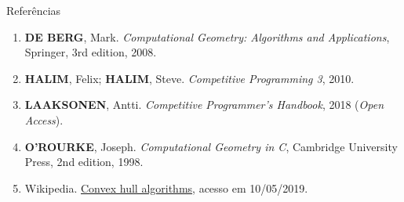 \begin{frame}[fragile]{Referências}

    \begin{enumerate}

        \item \textbf{DE BERG}, Mark. \textit{Computational Geometry: Algorithms and Applications}, Springer, 3rd edition, 2008.

        \item \textbf{HALIM}, Felix; \textbf{HALIM}, Steve. \textit{Competitive Programming 3}, 2010.
        \item \textbf{LAAKSONEN}, Antti. \textit{Competitive Programmer's Handbook}, 2018 (\textit{Open Access}).

        \item \textbf{O'ROURKE}, Joseph. \textit{Computational Geometry in C}, Cambridge University Press, 2nd edition, 1998. 

        \item Wikipedia. \href{https://en.wikipedia.org/wiki/Convex\_hull\_algorithms}{Convex hull
            algorithms}, acesso em 10/05/2019.

    \end{enumerate}

\end{frame}
